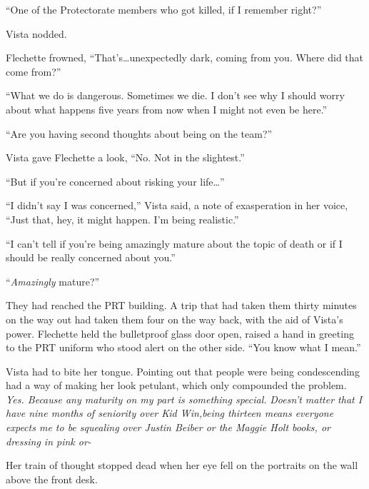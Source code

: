 ``One of the Protectorate members who got killed, if I remember right?''



Vista nodded.



Flechette frowned, ``That's\ldots unexpectedly dark, coming from you.  Where did that come from?''



``What we do is dangerous.  Sometimes we die.  I don't see why I should worry about what happens five years from now when I might not even be here.''



``Are you having second thoughts about being on the team?''



Vista gave Flechette a look, ``No.  Not in the slightest.''



``But if you're concerned about risking your life\ldots''



``I didn't say I was concerned,'' Vista said, a note of exasperation in her voice, ``Just that, hey, it might happen.  I'm being realistic.''



``I can't tell if you're being amazingly mature about the topic of death or if I should be really concerned about you.''



``\emph{Amazingly} mature?''



They had reached the PRT building.  A trip that had taken them thirty minutes on the way out had taken them four on the way back, with the aid of Vista's power.  Flechette held the bulletproof glass door open, raised a hand in greeting to the PRT uniform who stood alert on the other side.  ``You know what I mean.''



Vista had to bite her tongue.\emph{  }Pointing out that people were being condescending had a way of making her look petulant, which only compounded the problem.\emph{  Yes.  Because any maturity on my part is something special. }\emph{Doesn't matter that I have nine months of seniority over Kid Win,}\emph{being thirteen means everyone expects me to be squealing over Justin Beiber or the Maggie Holt books, or dressing in pink or-}



Her train of thought stopped dead when her eye fell on the portraits on the wall above the front desk.



